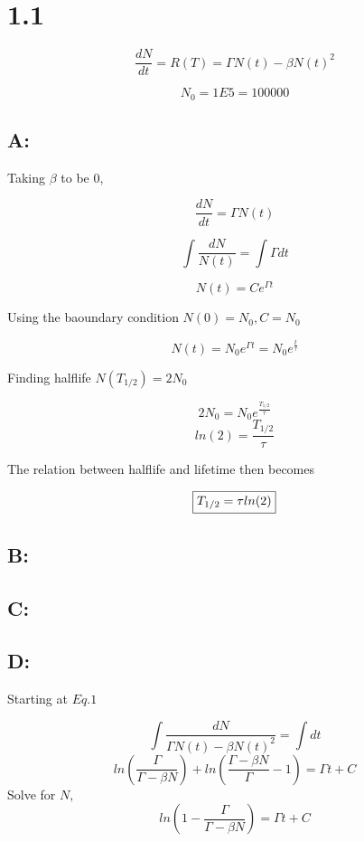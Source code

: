 \documentclass{article}
\begin{document}
\section*{1.1}
\begin{equation}
    \frac{dN}{dt} = R(T) = \Gamma N(t) - \beta N(t)^2
\end{equation}

$$N_0 = 1E5 = 100000$$

\subsection*{A:}
Taking $\beta$ to be 0,

\begin{equation}
    \frac{dN}{dt} = \Gamma N(t)
\end{equation}

$$\int \frac{dN}{ N(t)} = \int \Gamma dt$$

$$N(t) = Ce^{\Gamma t}$$

Using the baoundary condition $N(0) = N_0, C = N_0$

\begin{equation}
     N(t) = N_0e^{\Gamma t} = N_0e^{\frac{t}{\tau}}
\end{equation}

Finding halflife $N(T_{1/2}) = 2N_0$

$$2N_0 = N_0e^{\frac{T_{1/2}}{\tau}}$$
$$ln(2) = \frac{T_{1/2}}{\tau}$$

The relation between halflife and lifetime then becomes

\begin{equation}
    \fbox{$T_{1/2} = \tau ln(2)$}
\end{equation}

\subsection*{B:}
\subsection*{C:}
\subsection*{D:}
Starting at $Eq. 1$

$$\int \frac{dN}{\Gamma N(t) - \beta N(t)^2} = \int dt$$
$$ln(\frac{\Gamma}{\Gamma - \beta N}) + ln(\frac{\Gamma - \beta N}{\Gamma} - 1) = \Gamma t + C$$
Solve for $N$,
$$ln(1 - \frac{\Gamma}{\Gamma - \beta N}) = \Gamma t + C$$
\end{document}
